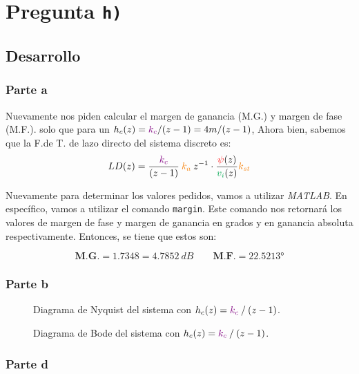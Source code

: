 \section{Pregunta \texttt{h)}}\label{pregunta-h}


\subsection{Desarrollo}

\subsubsection{Parte a}
Nuevamente nos piden calcular el margen de ganancia (M.G.) y margen de fase
(M.F.). solo que para un \(h_c(z)= \mathbin{\color{violet}k_c}/(z-1) = 4m / (z-1)\), Ahora bien, sabemos 
que la F.de T. de lazo directo del sistema discreto es:
\begin{equation}
  LD(z) = \frac{\mora{k_{c}}}{(z-1)} \nara{ k_{a}} z^{-1} \cdot \frac{\rojo{\psi}(z)}{\verd{v_i}(z)} \nara{k_{st}}  
\end{equation}

Nuevamente para determinar los valores pedidos, vamos a utilizar  \textit{MATLAB}. En específico, vamos a utilizar el comando \texttt{margin}. Este comando nos retornará los valores de margen de fase y margen de ganancia en grados y en ganancia absoluta respectivamente. Entonces, se tiene que estos son:

\begin{equation}
  \boxed{\textbf{M.G.} = 1.7348 = 4.7852\ \unit{dB}} \qquad \boxed{\textbf{M.F.} = \ang{22.5213}}
\end{equation}

\subsubsection{Parte b}

\begin{figure}[h]
  \centering
  
  \caption{Diagrama de Nyquist del sistema con $h_{c}(z) = \mathbin{\color{violet}k_{c}}\mathbin{/}(z-1)$.}
  \label{fig:nyquist-h1}
\end{figure}

\begin{figure}[h]
  \centering
  
  \caption{Diagrama de Bode del sistema con $h_{c}(z) = \mathbin{\color{violet}k_{c}}\mathbin{/}(z-1)$.}
  \label{fig:bode-h1}
\end{figure}

\subsubsection{Parte d}

